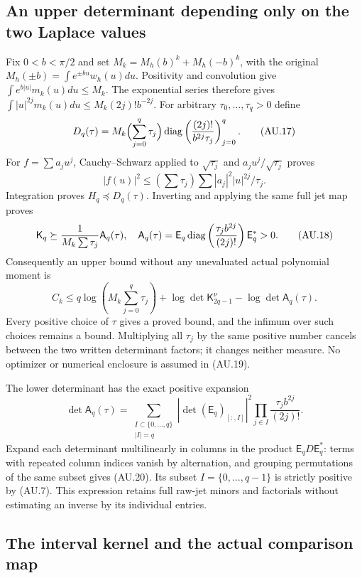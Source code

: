 \subsection{An upper determinant depending only on the two Laplace values}

Fix $0<b<\pi/2$ and set
$M_k=M_h(b)^k+M_h(-b)^k$, with the original
$M_h(\pm b)=\int e^{\pm bu}w_h(u)du$.
Positivity and convolution give $\int e^{b|u|}m_k(u)du\le M_k$.
The exponential series therefore gives
$\int |u|^{2j}m_k(u)du\le M_k(2j)!b^{-2j}$.
For arbitrary $\tau_0,\ldots,\tau_q>0$ define
\[
 D_q(\tau)=M_k\Bigl(\sum_{j=0}^q\tau_j\Bigr)
       \operatorname{diag}\left(\frac{(2j)!}{b^{2j}\tau_j}\right)_{j=0}^q.
 \tag{AU.17}
\]
For $f=\sum a_ju^j$, Cauchy--Schwarz applied to
$\sqrt{\tau_j}$ and $a_ju^j/\sqrt{\tau_j}$ proves
\[
 |f(u)|^2\le(\sum\tau_j)\sum |a_j|^2|u|^{2j}/\tau_j.
\]
Integration proves $H_q\preceq D_q(\tau)$. Inverting and applying
the same full jet map proves
\[
 \mathsf K_q\succeq\frac{1}{M_k\sum\tau_j}\mathsf A_q(\tau),
 \quad
 \mathsf A_q(\tau)=\mathsf E_q
       \operatorname{diag}\left(\frac{\tau_jb^{2j}}{(2j)!}\right)\mathsf E_q^*>0.
 \tag{AU.18}
\]
Consequently an upper bound without any unevaluated actual polynomial
moment is
\[
 \boxed{C_k\le q\log\left(M_k\sum_{j=0}^q\tau_j\right)
  +\log\det\mathsf K_{2q-1}^\nu-\log\det\mathsf A_q(\tau).}
 \tag{AU.19}
\]
Every positive choice of $\tau$ gives a proved bound, and the infimum
over such choices remains a bound. Multiplying all $\tau_j$ by the
same positive number cancels between the two written determinant
factors; it changes neither measure. No optimizer or numerical
enclosure is assumed in (AU.19).

The lower determinant has the exact positive expansion
\[
 \det\mathsf A_q(\tau)=
 \sum_{\substack{I\subset\{0,\ldots,q\}\\|I|=q}}
 |\det(\mathsf E_q)_{[:,I]}|^2
 \prod_{j\in I}\frac{\tau_jb^{2j}}{(2j)!}.                \tag{AU.20}
\]
Expand each determinant multilinearly in columns in the product
$\mathsf E_qD\mathsf E_q^*$: terms with repeated column indices
vanish by alternation, and grouping permutations of the same subset
gives (AU.20). Its subset $I=\{0,\ldots,q-1\}$ is strictly positive
by (AU.7). This expression retains full raw-jet minors and factorials
without estimating an inverse by its individual entries.

\subsection{The interval kernel and the actual comparison map}

